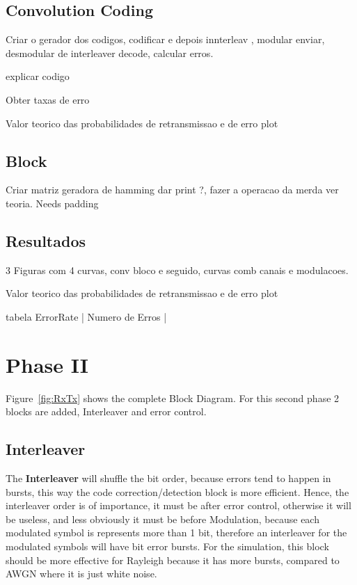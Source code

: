 
\subsection{Convolution Coding}

Criar o gerador dos codigos, codificar e depois innterleav , modular enviar, desmodular de interleaver decode, calcular erros.

explicar codigo 

Obter taxas de erro 

Valor teorico das probabilidades de retransmissao e de erro plot

\subsection{Block}



Criar matriz geradora de hamming dar print ?, fazer a operacao da merda ver teoria.
Needs padding 

\subsection{Resultados}

3 Figuras com 4 curvas, conv bloco e seguido, curvas comb canais e modulacoes.

Valor teorico das probabilidades de retransmissao e de erro plot

tabela ErrorRate | Numero de Erros | 



\section{Phase II}
\label{sec:phase2}

Figure~\ref{fig:RxTx} shows the complete Block Diagram. For this second phase 2 blocks are added, Interleaver and error control. 

\subsection{Interleaver}

The \textbf{Interleaver} will shuffle the bit order, because errors tend to happen in bursts, this way the code correction/detection block is more efficient. Hence, the interleaver order is of importance, it must be after error control, otherwise it will be useless, and less obviously it must be before Modulation, because each modulated symbol is represents more than 1 bit, therefore an interleaver for the modulated symbols will have bit error bursts. For the simulation, this block should be more effective for Rayleigh because it has more bursts, compared to AWGN where it is just white noise. 

